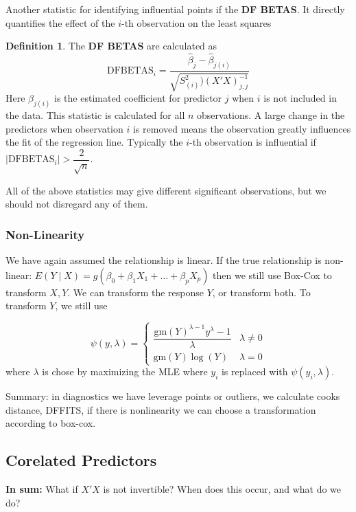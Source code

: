\documentclass[12pt, a4paper]{article}
\theoremstyle{definition}
\newtheorem{definition}{Definition}
\newcommand{\lam}{\lambda}
\newcommand{\f}{\frac}
\newcommand{\df}{\dfrac}
\newcommand{\abs}[1]{\left| #1 \right|}
\begin{document}
  	Another statistic for identifying influential points if the  {\bf DF BETAS}. It directly quantifies the effect of the $i$-th observation on the least squares 
	\begin{definition}
		The {\bf DF BETAS} are calculated as
		$$\text{DFBETAS}_i = \f{\hat\beta_j - \hat \beta_{j(i)}}{\sqrt{S^2_{(i)}) (X'X)^{-1}_{j,j}}}$$ Here $\beta_{j(i)}$ is the estimated coefficient for predictor $j$ when $i$ is not included in the data. This statistic is calculated for all $n$ observations. A large change in the predictors when observation $i$ is removed means the observation greatly influences the fit of the regression line.
		Typically the $i$-th observation is influential if $\abs{\text{DFBETAS}_i} > \df2{\sqrt{n}}$.
	\end{definition}
	
	All of the above statistics may give different significant observations, but we should not disregard any of them.
	
	\subsubsection{Non-Linearity}
	
	We have again assumed the relationship is linear. If the true relationship is non-linear: $E(Y \mid X) = g(\beta_0 + \beta_1 X_1 + \ldots + \beta_p X_p)$ then we still use Box-Cox to transform $X,Y$. We can transform the response $Y$, or transform both. To transform $Y$, we still use 
	
	$$
	\psi(y, \lambda) = \begin{cases}
		\df{\text{gm}(Y)^{\lam - 1}y^\lambda - 1 }\lam & \lam \neq 0 \\
		\text{gm}(Y)\log(Y) & \lam = 0
	\end{cases}
	$$
	where $\lam$ is chose by maximizing the MLE where $y_i$ is replaced with $\psi(y_i, \lam)$.
	
	Summary: in diagnostics we have leverage points or outliers, we calculate cooks distance, DFFITS, if there is nonlinearity we can choose a transformation according to box-cox.
	
	\subsection{Corelated Predictors}
	
	{\bf In sum:} What if $X'X$ is not invertible? When does this occur, and what do we do?\\
	
\end{document}
